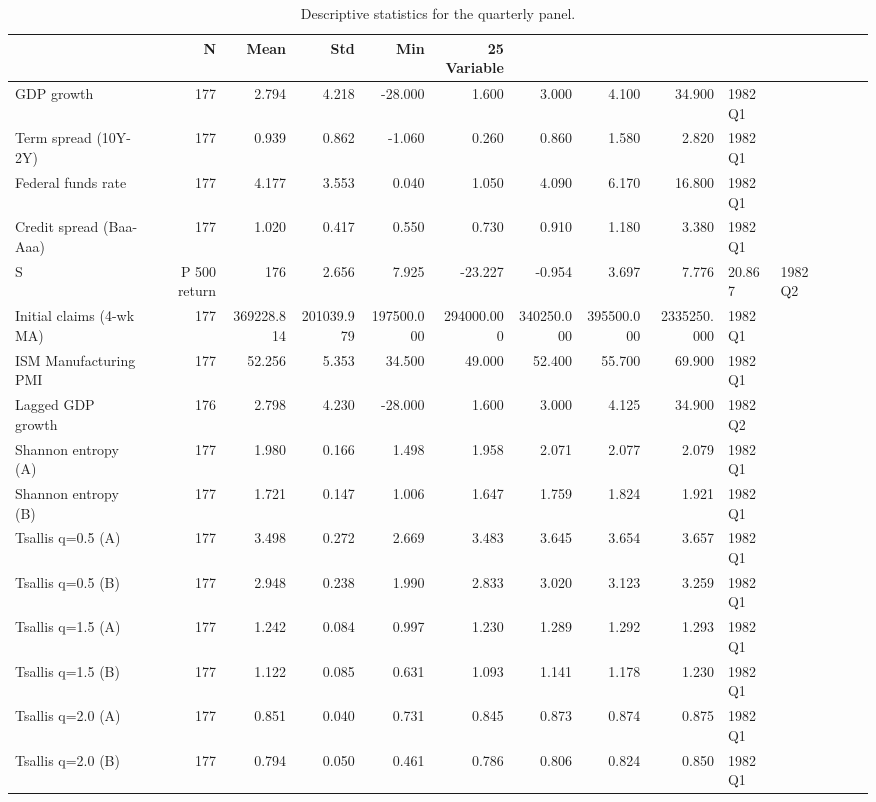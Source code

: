 \begin{table}[htbp]
\caption{Descriptive statistics for the quarterly panel.}
\label{tab:descriptive_statistics}
\begin{tabular}{lrrrrrrrrl}
\toprule
 & N & Mean & Std & Min & 25%
Variable &  &  &  &  &  &  &  &  &  \\
\midrule
GDP growth & 177 & 2.794 & 4.218 & -28.000 & 1.600 & 3.000 & 4.100 & 34.900 & 1982Q1 \\
Term spread (10Y-2Y) & 177 & 0.939 & 0.862 & -1.060 & 0.260 & 0.860 & 1.580 & 2.820 & 1982Q1 \\
Federal funds rate & 177 & 4.177 & 3.553 & 0.040 & 1.050 & 4.090 & 6.170 & 16.800 & 1982Q1 \\
Credit spread (Baa-Aaa) & 177 & 1.020 & 0.417 & 0.550 & 0.730 & 0.910 & 1.180 & 3.380 & 1982Q1 \\
S&P 500 return & 176 & 2.656 & 7.925 & -23.227 & -0.954 & 3.697 & 7.776 & 20.867 & 1982Q2 \\
Initial claims (4-wk MA) & 177 & 369228.814 & 201039.979 & 197500.000 & 294000.000 & 340250.000 & 395500.000 & 2335250.000 & 1982Q1 \\
ISM Manufacturing PMI & 177 & 52.256 & 5.353 & 34.500 & 49.000 & 52.400 & 55.700 & 69.900 & 1982Q1 \\
Lagged GDP growth & 176 & 2.798 & 4.230 & -28.000 & 1.600 & 3.000 & 4.125 & 34.900 & 1982Q2 \\
Shannon entropy (A) & 177 & 1.980 & 0.166 & 1.498 & 1.958 & 2.071 & 2.077 & 2.079 & 1982Q1 \\
Shannon entropy (B) & 177 & 1.721 & 0.147 & 1.006 & 1.647 & 1.759 & 1.824 & 1.921 & 1982Q1 \\
Tsallis q=0.5 (A) & 177 & 3.498 & 0.272 & 2.669 & 3.483 & 3.645 & 3.654 & 3.657 & 1982Q1 \\
Tsallis q=0.5 (B) & 177 & 2.948 & 0.238 & 1.990 & 2.833 & 3.020 & 3.123 & 3.259 & 1982Q1 \\
Tsallis q=1.5 (A) & 177 & 1.242 & 0.084 & 0.997 & 1.230 & 1.289 & 1.292 & 1.293 & 1982Q1 \\
Tsallis q=1.5 (B) & 177 & 1.122 & 0.085 & 0.631 & 1.093 & 1.141 & 1.178 & 1.230 & 1982Q1 \\
Tsallis q=2.0 (A) & 177 & 0.851 & 0.040 & 0.731 & 0.845 & 0.873 & 0.874 & 0.875 & 1982Q1 \\
Tsallis q=2.0 (B) & 177 & 0.794 & 0.050 & 0.461 & 0.786 & 0.806 & 0.824 & 0.850 & 1982Q1 \\

\end{tabular}
\end{table}
